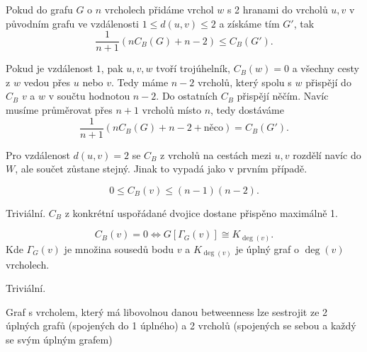 \documentclass[12pt]{article}					%
\begin{document}
    \begin{tvrzeni}
        Pokud do grafu $G$ o $n$ vrcholech přidáme vrchol $w$ s 2 hranami do vrcholů $u, v$ v původním grafu ve vzdálenosti $1 ≤ d(u, v) ≤ 2$ a získáme tím $G'$, tak
        $$ \frac{1}{n+1}(nC_B(G) + n-2) ≤ C_B(G'). $$ 

        \begin{dukazin}
            Pokud je vzdálenost $1$, pak $u, v, w$ tvoří trojúhelník, $C_B(w) = 0$ a všechny cesty z $w$ vedou přes $u$ nebo $v$. Tedy máme $n-2$ vrcholů, který spolu s $w$ přispějí do $C_B$ $v$ a $w$ v součtu hodnotou $n - 2$. Do ostatních $C_B$ přispějí něčím. Navíc musíme průměrovat přes $n+1$ vrcholů místo $n$, tedy dostáváme
            $$ \frac{1}{n + 1}(nC_B(G) + n - 2 + \text{něco}) = C_B(G'). $$

            Pro vzdálenost $d(u, v) = 2$ se $C_B$ z vrcholů na cestách mezi $u, v$ rozdělí navíc do $W$, ale součet zůstane stejný. Jinak to vypadá jako v prvním případě.
        \end{dukazin}
    \end{tvrzeni}


    \begin{tvrzeni}
        $$ 0 ≤ C_B(v) ≤ (n-1)(n-2). $$
        
        \begin{dukazin}
            Triviální. $C_B$ z konkrétní uspořádané dvojice dostane přispěno maximálně 1.
        \end{dukazin}

        \begin{dukazin}
            $$ C_B(v) = 0 \Leftrightarrow G[\Gamma_G(v)] \cong K_{\deg(v)}. $$
            Kde $\Gamma_G(v)$ je množina sousedů bodu $v$ a $K_{\deg(v)}$ je úplný graf o $\deg(v)$ vrcholech.

            \begin{dukazin}
                Triviální.
            \end{dukazin}
        \end{dukazin}
    \end{tvrzeni}

    \begin{poznamka}
        Graf s vrcholem, který má libovolnou danou betweenness lze sestrojit ze 2 úplných grafů (spojených do 1 úplného) a 2 vrcholů (spojených se sebou a každý se svým úplným grafem)
    \end{poznamka}
\end{document}
